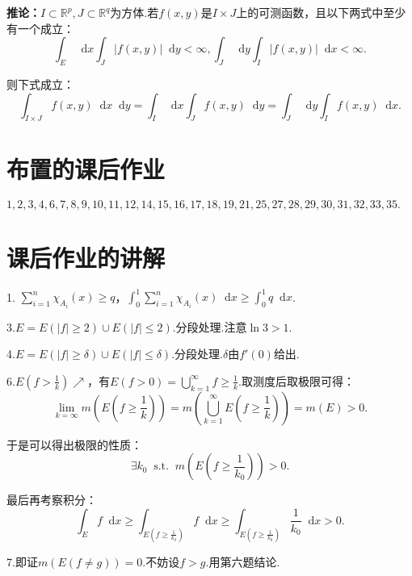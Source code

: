 \documentclass[bwprint, withoutpreface]{cumcmthesis}
\newcommand*{\dif}{\mathop{}\!\mathrm{d}}
\begin{document}
\textbf{推论：}$I \subset \mathbb{R}^p, J \subset \mathbb{R}^q$为方体.若$f(x, y)$是$I \times J$上的可测函数，且以下两式中至少有一个成立：
\begin{equation*}
	\int_E \dif x \int_J |f(x, y)| \dif y < \infty, \int_J \dif y \int_I |f(x, y)| \dif x < \infty.
\end{equation*}

则下式成立：
\begin{equation*}
	\int_{I \times J} f(x, y) \dif x \dif y = \int_I \dif x \int_J f(x, y) \dif y = \int_J \dif y \int_I f(x, y) \dif x. 
\end{equation*}

\appendix
\section{布置的课后作业}
\indent $1,2,3,4,6,7,8,9,10,11,12,14,15,16,17,18,19,21,25,27,28,29,30,31,32,33,35.$

\section{课后作业的讲解}
1. $\sum_{i = 1}^{n}{\chi_{A_i}(x)} \geqslant q$，$\int_{0}^{1} \sum_{i = 1}^{n}{\chi_{A_i}(x)} \dif x \geqslant \int_{0}^{1} q \dif x$.

3.$E = E(|f| \geqslant 2) \cup E(|f| \leqslant 2)$.分段处理.注意$\ln{3} > 1$.

4.$E = E(|f| \geqslant \delta) \cup E(|f| \leqslant \delta)$.分段处理.$\delta$由$f'(0)$给出.

6.$E(f > \frac{1}{k}) \nearrow$，有$E(f > 0) = \bigcup_{k = 1}^{\infty}{f \geqslant \frac{1}{k}}$.取测度后取极限可得：
\begin{equation*}
	\lim_{k = \infty} m(E(f \geqslant \frac{1}{k})) = m(\bigcup_{k = 1}^{\infty}{E(f \geqslant \frac{1}{k})}) = m(E) > 0.
\end{equation*}

于是可以得出极限的性质：
\begin{equation*}
	\exists k_0 \mathop{} \! \mathrm{s.t.} \! \mathop{} m(E(f \geqslant \frac{1}{k_0})) > 0.
\end{equation*}

最后再考察积分：
\begin{equation*}
	\int_E f \dif x \geqslant \int_{E(f \geqslant \frac{1}{k_0})} f \dif x \geqslant \int_{E(f \geqslant \frac{1}{k_0})} \frac{1}{k_0} \dif x > 0. 
\end{equation*}

7.即证$m(E(f \neq g)) = 0$.不妨设$f > g$.用第六题结论.
\end{document}
